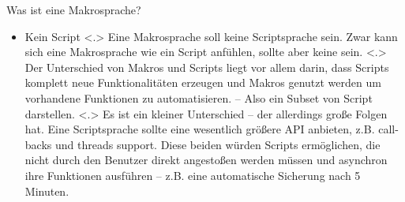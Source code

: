 \begin{frame}{Was ist eine Makrosprache?}
\begin{itemize}[<+- | alert@+>]
      \item
        Kein Script
            \note[item]<.>{
              Eine Makrosprache soll keine Scriptsprache sein. Zwar kann sich eine Makrosprache wie ein Script anfühlen, sollte aber keine sein.
            }
            \note[item]<.>{
              Der Unterschied von Makros und Scripts liegt vor allem darin, dass Scripts komplett neue Funktionalitäten erzeugen und Makros genutzt werden um vorhandene Funktionen zu automatisieren. -- Also ein Subset von Script darstellen.
            }
            \note[item]<.>{
              Es ist ein kleiner Unterschied -- der allerdings große Folgen hat. Eine Scriptsprache sollte eine wesentlich größere API anbieten, z.B. call-backs und threads support. Diese beiden würden Scripts ermöglichen, die nicht durch den Benutzer direkt angestoßen werden müssen und asynchron ihre Funktionen ausführen -- z.B. eine automatische Sicherung nach 5 Minuten.
            }
    \end{itemize}
  \end{frame}

